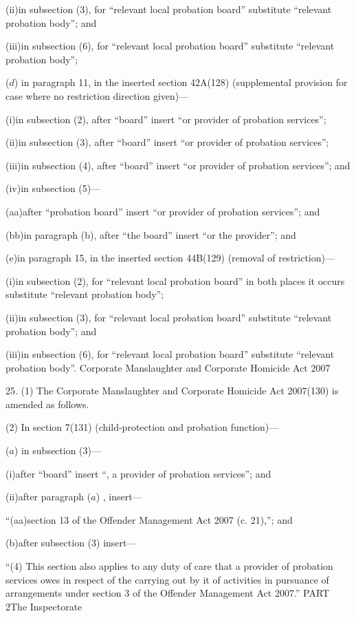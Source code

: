 \documentclass[12pt,a4paper]{article}
\begin{document}
(ii)in subsection (3), for “relevant local probation board” substitute “relevant probation body”; and

(iii)in subsection (6), for “relevant local probation board” substitute “relevant probation body”;

($d$) in paragraph 11, in the inserted section 42A(128) (supplemental provision for case where no restriction direction given)—

(i)in subsection (2), after “board” insert “or provider of probation services”;

(ii)in subsection (3), after “board” insert “or provider of probation services”;

(iii)in subsection (4), after “board” insert “or provider of probation services”; and

(iv)in subsection (5)—

(aa)after “probation board” insert “or provider of probation services”; and

(bb)in paragraph (b), after “the board” insert “or the provider”; and

(e)in paragraph 15, in the inserted section 44B(129) (removal of restriction)—

(i)in subsection (2), for “relevant local probation board” in both places it occurs substitute “relevant probation body”;

(ii)in subsection (3), for “relevant local probation board” substitute “relevant probation body”; and

(iii)in subsection (6), for “relevant local probation board” substitute “relevant probation body”.
Corporate Manslaughter and Corporate Homicide Act 2007

25.  (1)  The Corporate Manslaughter and Corporate Homicide Act 2007(130) is amended as follows.

(2) In section 7(131) (child-protection and probation function)—

($a$) in subsection (3)—

(i)after “board” insert “, a provider of probation services”; and

(ii)after paragraph ($a$) , insert—

“(aa)section 13 of the Offender Management Act 2007 (c. 21),”; and

(b)after subsection (3) insert—

“(4) This section also applies to any duty of care that a provider of probation services owes in respect of the carrying out by it of activities in pursuance of arrangements under section 3 of the Offender Management Act 2007.”
PART 2The Inspectorate
\end{document}
